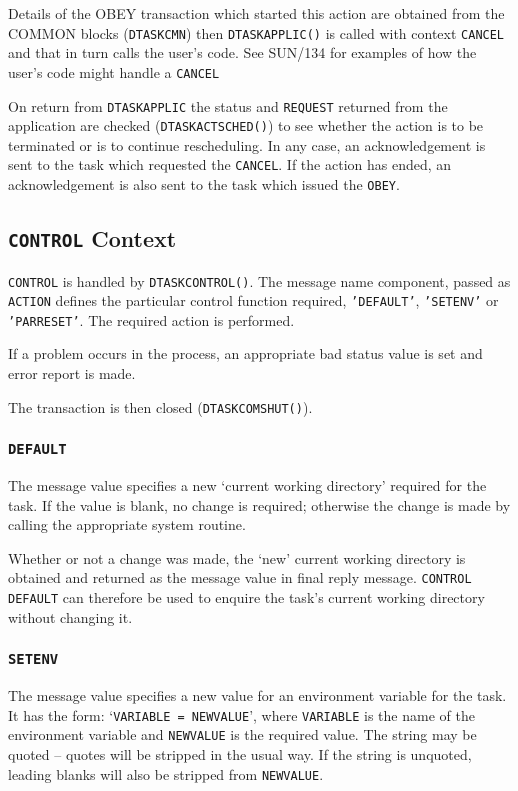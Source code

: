\documentclass[twoside,11pt]{article}
\newcommand{\xref}[3]{#1}
\renewcommand{\_}{\texttt{\symbol{95}}}
\begin{document}
Details of the OBEY transaction which started this action are obtained from
the COMMON blocks (\texttt{DTASK\_CMN}) then \texttt{DTASK\_APPLIC()} is called
with context \texttt{CANCEL} and that in turn calls the user's code.
See
\xref{SUN/134}{sun134}{}
for examples of how the user's code might handle a
\texttt{CANCEL}

On return from \texttt{DTASK\_APPLIC} the status and \texttt{REQUEST} returned
from the application are checked (\texttt{DTASK\_ACT\_SCHED()}) to see whether
the action is to be terminated or is to continue rescheduling.
In any case, an acknowledgement is sent to the task which requested the
\texttt{CANCEL}.
If the action has ended, an acknowledgement is also sent to the task which
issued the \texttt{OBEY}.

\subsection{\label{control_context}\texttt{CONTROL} Context}
\texttt{CONTROL} is handled by \texttt{DTASK\_CONTROL()}.
The message name component, passed as \texttt{ACTION} defines the particular
control function required, \texttt{'DEFAULT'}, \texttt{'SETENV'} or
\texttt{'PAR\_RESET'}.
The required action is performed.

If a problem occurs in the process, an appropriate bad status value is set
and error report is made.

The transaction is then closed (\texttt{DTASK\_COMSHUT()}).

\subsubsection{\texttt{DEFAULT}}
The message value specifies a new `current working directory' required for the
task. If the value is blank, no change is required; otherwise the change is
made by calling the appropriate system routine.

Whether or not a change was made, the `new' current working directory is
obtained and returned as the message value in final reply message.
\texttt{CONTROL DEFAULT} can therefore be used to enquire the task's current
working directory without changing it.

\subsubsection{\texttt{SETENV}}
The message value specifies a new value for an environment variable for the
task. It has the form: `\texttt{VARIABLE = NEWVALUE}', where \texttt{VARIABLE}
is the name of the environment variable and \texttt{NEWVALUE} is the required
value. The string may be quoted -- quotes will be stripped in the usual way.
If the string is unquoted, leading blanks will also be stripped from
\texttt{NEWVALUE}.
\end{document}
